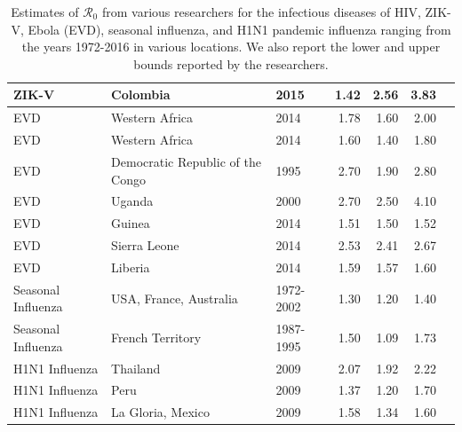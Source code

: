 \message{ !name(draft_v13.tex)}\documentclass[12pt]{article}
\newcommand{\rr}{\ensuremath{\mathcal{R}_0}}
\begin{document}
\begin{landscape}
\begin{table}[H]
\begin{tabular}{@{}lllrrrl@{}}
ZIK-V                & Colombia                         & 2015                          & 1.42        & 2.56           & 3.83           & \cite{majumder2016}  \\ \hline
EVD               & Western Africa                   & 2014                          & 1.78        & 1.60            & 2.00              & \cite{fisman2014}   \\
EVD & Western Africa                   & 2014                          & 1.60         & 1.40            & 1.80            & \cite{towers2014}  \\
EVD                 & Democratic Republic of the Congo & 1995                          & 2.70         & 1.90            & 2.80            & \cite{legrand2007}  \\
EVD                 & Uganda                           & 2000                          & 2.70         & 2.50            & 4.10            & \cite{legrand2007}  \\
EVD                 & Guinea                           & 2014                          & 1.51        & 1.50            & 1.52           & \cite{althaus2014}   \\
EVD                 & Sierra Leone                     & 2014                          & 2.53        & 2.41           & 2.67           & \cite{althaus2014}      \\
EVD                 & Liberia                          & 2014                          & 1.59        & 1.57           & 1.60            & \cite{althaus2014}    \\ \hline
Seasonal Influenza  & USA, France, Australia           & 1972-2002 & 1.30         & 1.20            & 1.40            & \cite{chowell2008}  \\
Seasonal Influenza  & French Territory                 & 1987-1995                     & 1.50         & 1.09           & 1.73           & \cite{bonabeau1998}  \\ \hline
H1N1 Influenza      & Thailand                         & 2009                          & 2.07        & 1.92           & 2.22           & \cite{desilva2009}     \\
H1N1 Influenza     & Peru                             & 2009                          & 1.37        & 1.20            & 1.70            & \cite{desilva2009}        \\
H1N1 Influenza      & La Gloria, Mexico                  & 2009                          & 1.58        & 1.34           & 1.60            & \cite{fraser2009}     \\ \bottomrule
\end{tabular}
\caption{Estimates of $\rr$ from various researchers for the infectious diseases of HIV, ZIK-V, Ebola (EVD), seasonal influenza, and H1N1 pandemic influenza ranging from the years 1972-2016 in various locations.  We also report the lower and upper bounds reported by the researchers.}
\label{tab:r0-real-ex}
\end{table}
\end{landscape}
\end{document}
